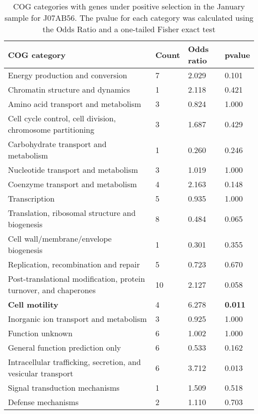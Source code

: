 \begin{table}[]
\footnotesize 
	\tabcolsep=0.11cm 
\caption{COG categories with genes under positive selection in the January sample for J07AB56. The pvalue for each category was calculated using the Odds Ratio and a one-tailed Fisher exact test} 
\begin{tabularx}{\textwidth}{L{6cm}R{2cm}R{2cm}R{2cm}} 
\hline 
\textbf{COG category} & \textbf{Count} & \textbf{Odds ratio} & \textbf{pvalue} \\ 
\hline 
Energy production and conversion & 7 & 2.029 & 0.101 \\ 
Chromatin structure and dynamics & 1 & 2.118 & 0.421 \\ 
Amino acid transport and metabolism & 3 & 0.824 & 1.000 \\ 
Cell cycle control, cell division, chromosome partitioning & 3 & 1.687 & 0.429 \\ 
Carbohydrate transport and metabolism & 1 & 0.260 & 0.246 \\ 
Nucleotide transport and metabolism & 3 & 1.019 & 1.000 \\ 
Coenzyme transport and metabolism & 4 & 2.163 & 0.148 \\ 
Transcription & 5 & 0.935 & 1.000 \\ 
Translation, ribosomal structure and biogenesis & 8 & 0.484 & 0.065 \\ 
Cell wall/membrane/envelope biogenesis & 1 & 0.301 & 0.355 \\ 
Replication, recombination and repair & 5 & 0.723 & 0.670 \\ 
Post-translational modification, protein turnover, and chaperones & 10 & 2.127 & 0.058 \\ 
\textbf{Cell motility} & 4 & 6.278 & \textbf{0.011} \\ 
Inorganic ion transport and metabolism & 3 & 0.925 & 1.000 \\ 
Function unknown & 6 & 1.002 & 1.000 \\ 
General function prediction only & 6 & 0.533 & 0.162 \\ 
Intracellular trafficking, secretion, and vesicular transport & 6 & 3.712 & 0.013 \\ 
Signal transduction mechanisms & 1 & 1.509 & 0.518 \\ 
Defense mechanisms & 2 & 1.110 & 0.703 \\ 
\end{tabularx} 
\label{January_COG_Selection_J07AB56} 
 \end{table} 

